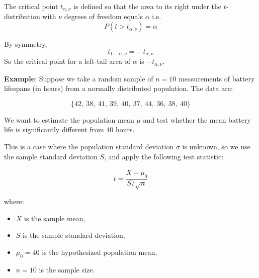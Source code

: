 \documentclass[twoside]{book}
\begin{document}
\begin{center}
\end{center}

The critical point \(t_{\alpha, \nu}\) is defined so that the area to its right under the \(t\)-distribution with \(\nu\) degrees of freedom equals \(\alpha\) i.e.  
$$P\left(t > t_{\alpha, \nu} \right)= \alpha$$

By symmetry,  
\[
t_{1-\alpha, \nu} = -\,t_{\alpha, \nu}
\]  
So the critical point for a left‐tail area of \(\alpha\) is \(-t_{\alpha, \nu}\).

\textbf{Example}: Suppose we take a random sample of \( n = 10 \) measurements of battery lifespans (in hours) from a normally distributed population. The data are:

\[
\{42,\ 38,\ 41,\ 39,\ 40,\ 37,\ 44,\ 36,\ 38,\ 40\}
\]

We want to estimate the population mean \( \mu \) and test whether the mean battery life is significantly different from 40 hours.

This is a case where the population standard deviation \( \sigma \) is unknown, so we use the sample standard deviation \( S \), and apply the following test statistic:

\[
t = \frac{\overline{X} - \mu_0}{S / \sqrt{n}}
\]

where:
\begin{itemize}
  \item \( \overline{X} \) is the sample mean,
  \item \( S \) is the sample standard deviation,
  \item \( \mu_0 = 40 \) is the hypothesized population mean,
  \item \( n = 10 \) is the sample size.
\end{itemize}
\end{document}
